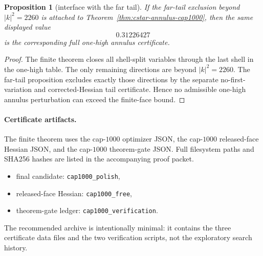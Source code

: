 \documentclass[11pt]{article}
\newtheorem{proposition}{Proposition}
\begin{document}
\begin{proposition}[interface with the far tail]
\label{prop:cstar-annulus-tail-interface}
If the far-tail exclusion beyond \(|k|^2=2260\) is attached to
Theorem~\ref{thm:cstar-annulus-cap1000}, then the same displayed value
\[
   0.31226427
\]
is the corresponding full one-high annulus certificate.
\end{proposition}

\begin{proof}
The finite theorem closes all shell-split variables through the last shell in
the one-high table.  The only remaining directions are beyond
\(|k|^2=2260\).  The far-tail proposition excludes exactly those directions by
the separate no-first-variation and corrected-Hessian tail certificate.  Hence
no admissible one-high annulus perturbation can exceed the finite-face bound.
\end{proof}

\paragraph{Certificate artifacts.}
The finite theorem uses the cap-\(1000\) optimizer JSON, the cap-\(1000\)
released-face Hessian JSON, and the cap-\(1000\) theorem-gate JSON.  Full
filesystem paths and SHA256 hashes are listed in the accompanying proof packet.
\begin{itemize}
\item final candidate: \texttt{cap1000\_polish},
\item released-face Hessian: \texttt{cap1000\_free},
\item theorem-gate ledger: \texttt{cap1000\_verification}.
\end{itemize}

The recommended archive is intentionally minimal: it contains the three
certificate data files and the two verification scripts, not the exploratory
search history.
\end{document}
